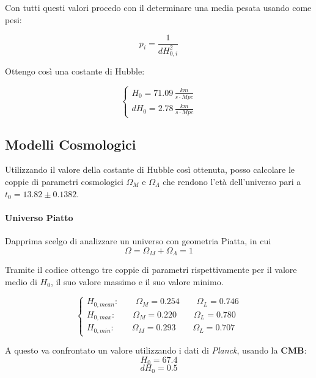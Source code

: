 \documentclass{article}
\begin{document}
Con tutti questi valori procedo con il determinare una media pesata
usando come pesi:

\begin{equation*}
  p_i = \frac{1}{dH_{0,i}^2}
\end{equation*}

Ottengo così una costante di Hubble:

\begin{equation}
  \begin{cases}
    H_0 = 71.09 \, \frac{km}{s\cdot Mpc} \\
    dH_0 = 2.78 \, \frac{km}{s \cdot Mpc}
  \end{cases}
\end{equation}

\subsection{Modelli Cosmologici}

Utilizzando il valore della costante di Hubble così ottenuta, posso
calcolare le coppie di parametri cosmologici $\Omega_M$ e
$\Omega_\Lambda$ che rendono l'età dell'universo pari a $t_0 = 13.82
\pm 0.1382$.

\paragraph{Universo Piatto}

Dapprima scelgo di analizzare un universo con geometria Piatta, in cui
\begin{equation*}
  \Omega = \Omega_M + \Omega_\Lambda = 1
\end{equation*}

Tramite il codice ottengo tre coppie di parametri rispettivamente per
il valore medio di $H_0$, il suo valore massimo e il suo valore
minimo.

\begin{equation}
  \begin{cases}
    H_{0,mean} : \qquad \Omega_M = 0.254 \qquad \Omega_L = 0.746 \\
    H_{0,max} : \qquad \Omega_M = 0.220 \qquad \Omega_L = 0.780 \\
    H_{0,min} : \qquad \Omega_M = 0.293 \qquad \Omega_L = 0.707
  \end{cases}
\end{equation}

  A questo va confrontato un valore utilizzando i dati di
  \emph{Planck}, usando la \textbf{CMB}:
  $$ H_0 = 67.4 $$
  $$ dH_0 = 0.5 $$
\end{document}
